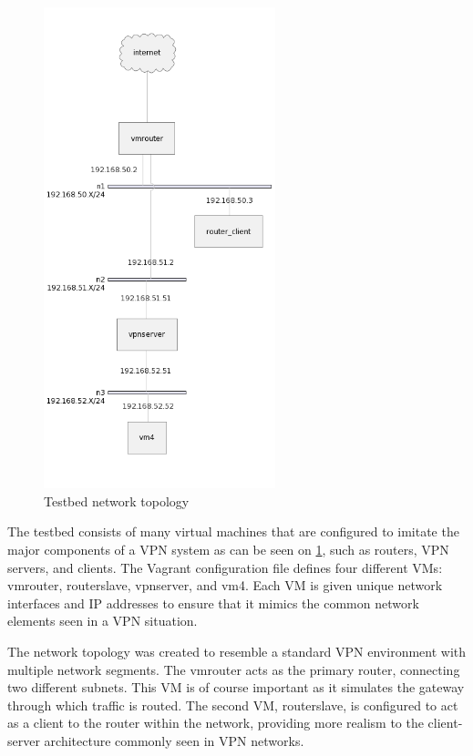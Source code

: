 \documentclass[12pt, fleqn, a4paper]{article}
\begin{document}
\begin{figure}[H]
	\centering
	\includegraphics[width=0.6\textwidth]{img/topology}
	\caption{Testbed network topology}
  \label{fig:topology}
\end{figure}

The testbed consists of many virtual machines that are configured to imitate the major components of a VPN system as can be seen on \cref{fig:topology}, such as routers, VPN servers, and clients. The Vagrant configuration file defines four different VMs: vmrouter, routerslave, vpnserver, and vm4. Each VM is given unique network interfaces and IP addresses to ensure that it mimics the common network elements seen in a VPN situation.

The network topology was created to resemble a standard VPN environment with multiple network segments. The vmrouter acts as the primary router, connecting two different subnets. This VM is of course important as it simulates the gateway through which traffic is routed. The second VM, routerslave, is configured to act as a client to the router within the network, providing more realism to the client-server architecture commonly seen in VPN networks.
\end{document}
